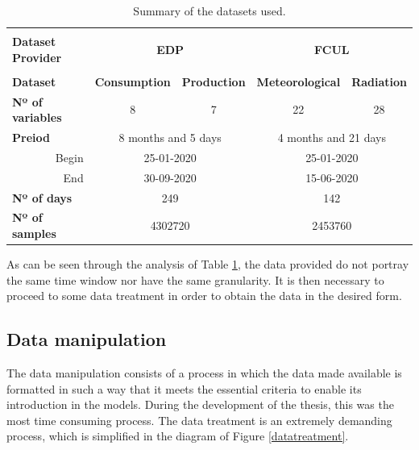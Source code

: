 \begin{longtable}{|l|c|c|c|c|}
    \caption{Summary of the datasets used.}
    \label{table2}\\
    
    \hline & \multicolumn{2}{c|}{}&\multicolumn{2}{c|}{}\\[-0.5ex]
    \textbf{Dataset Provider}   & \multicolumn{2}{c|}{\textbf{EDP}} & \multicolumn{2}{c|}{\textbf{FCUL}}\\[1ex]
    \hline & \multicolumn{2}{c|}{}&\multicolumn{2}{c|}{}\\[-0.5ex]

    
    \textbf{Dataset} & \multicolumn{1}{l|}{\textbf{Consumption}} & \textbf{Production} & \multicolumn{1}{l|}{\textbf{Meteorological}} & \textbf{Radiation}  \\
    \textbf{Nº of variables} & \multicolumn{1}{c|}{8} & \multicolumn{1}{c|}{7} &  22  & \multicolumn{1}{c|}{28} \\
    \textbf{Preiod} & \multicolumn{2}{c|}{8 months and 5 days} & \multicolumn{2}{c|}{4 months and 21 days}  \\
    \multicolumn{1}{|r|}{Begin} & \multicolumn{2}{c|}{25-01-2020} & \multicolumn{2}{c|}{25-01-2020} \\
    \multicolumn{1}{|r|}{End}  & \multicolumn{2}{c|}{30-09-2020}  & \multicolumn{2}{c|}{15-06-2020} \\
    \textbf{Nº of days}       & \multicolumn{2}{c|}{249}     & \multicolumn{2}{c|}{142}    \\             
    \textbf{Nº of samples}    & \multicolumn{2}{c|}{4302720} & \multicolumn{2}{c|}{2453760} \\[1ex]
    \hline
    

\end{longtable}

As can be seen through the analysis of Table \ref{table2}, the data provided do not portray the same time window nor have the same granularity. It is then necessary to proceed to some data treatment in order to obtain the data in the desired form.

\subsection{Data manipulation}\label{sec:data_manip}

The data manipulation consists of a process in which the data made available is formatted in such a way that it meets the essential criteria to enable its introduction in the models. During the development of the thesis, this was the most time consuming process. The data treatment is an extremely demanding process, which is simplified in the diagram of Figure \ref{datatreatment}.

